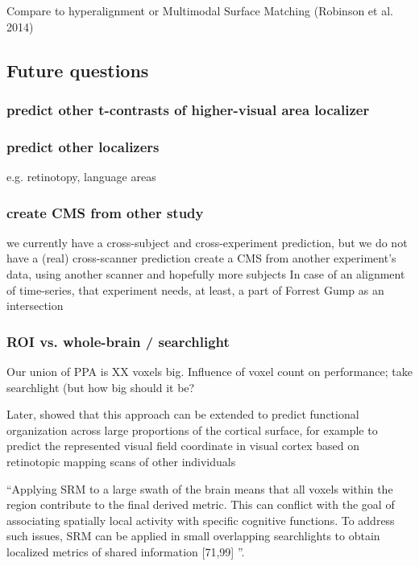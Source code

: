 Compare to hyperalignment or Multimodal Surface Matching (Robinson et al. 2014)


\subsection{Future questions}


\subsubsection{predict other t-contrasts of higher-visual area localizer}

\subsubsection{predict other localizers}
%
e.g. retinotopy, language areas


\subsubsection{create CMS from other study}
%
we currently have a cross-subject and cross-experiment prediction,
but we do not have a (real) cross-scanner prediction
%
create a CMS from another experiment’s data,
using another scanner and hopefully more subjects
%
In case of an alignment of time-series,
that experiment needs, at least, a part of Forrest Gump as an intersection


\subsubsection{ROI vs. whole-brain / searchlight}
%
Our union of PPA is XX voxels big.
%
Influence of voxel count on performance; take searchlight (but how big should it
be?

Later, \citet{guntupalli2016model} showed that this approach can be extended to
predict functional organization across large proportions of the cortical
surface, for example to predict the represented visual field coordinate in
visual cortex based on retinotopic mapping scans of other individuals

``Applying SRM to a large swath of the brain means that all voxels within the
region contribute to the final derived metric. This can conflict with the goal
of associating spatially local activity with specific cognitive functions. To
address such issues, SRM can be applied in small overlapping searchlights to
obtain localized metrics of shared information [71,99]
\citep{cohen2017computational}''.



